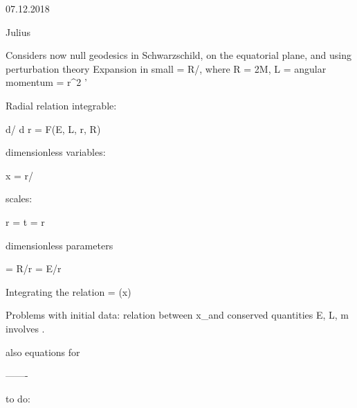 07.12.2018

Julius

Considers now null geodesics in Schwarzschild, on the equatorial plane, and using perturbation theory
Expansion in small \rho = R/, where R = 2M, L = angular momentum = r^2 \phi'

Radial relation integrable:

d\lambda / d r = F(E, L, r, R)

dimensionless variables:

 x = r/
 
scales:

	\hat r = 
	\hat t = \hat r
	
dimensionless parameters

	\rho = R/\hat r
	\epsilon = E/\hat r	 
	
Integrating the relation \lambda = \lambda (x)

Problems with initial data: relation between x_\calO and conserved quantities E, L, m involves \rho.

also equations for 



-------

to do:

